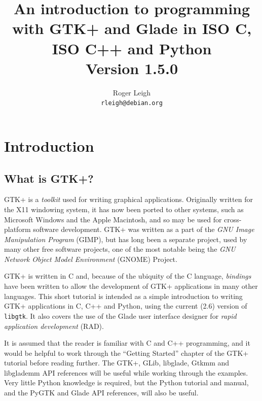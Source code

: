 \documentclass[a4paper,oneside]{article}
\newcommand{\filename}[1]{\texttt{#1}}
\begin{document}
\title{An introduction to programming with GTK+ and Glade in ISO C,
  ISO C++ and Python\\\bigskip\large{Version 1.5.0}}
\author{Roger Leigh\\\texttt{rleigh@debian.org}}
\maketitle

\tableofcontents

\listoffigures

\lstlistoflistings


\section{Introduction}

\subsection{What is GTK+?}

GTK+ is a \emph{toolkit} used for writing graphical applications.
Originally written for the X11 windowing system, it has now been
ported to other systems, such as Microsoft Windows and the Apple
Macintosh, and so may be used for cross-platform software development.
GTK+ was written as a part of the \emph{GNU Image Manipulation
  Program} (GIMP), but has long been a separate project, used by many
other free software projects, one of the most notable being the
\emph{GNU Network Object Model Environment} (GNOME) Project.

GTK+ is written in C and, because of the ubiquity of the C language,
\emph{bindings} have been written to allow the development of GTK+
applications in many other languages.  This short tutorial is intended
as a simple introduction to writing GTK+ applications in C, C++ and
Python, using the current (2.6) version of \filename{libgtk}.  It also
covers the use of the Glade user interface designer for \emph{rapid
  application development} (RAD).

It is assumed that the reader is familiar with C and C++ programming,
and it would be helpful to work through the ``Getting Started''
chapter of the GTK+ tutorial before reading further.  The GTK+, GLib,
libglade, Gtkmm and libglademm API references will be useful while
working through the examples.  Very little Python knowledge is
required, but the Python tutorial and manual, and the PyGTK and Glade
API references, will also be useful.
\end{document}
